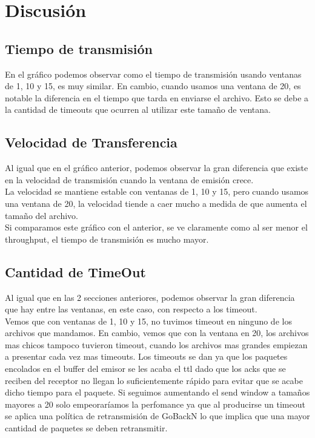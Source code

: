 \newpage
\section{Discusión}
\subsection{Tiempo de transmisión}
\indent En el gráfico podemos observar como el tiempo de transmisión usando
ventanas de 1, 10 y 15, es muy similar. En cambio, cuando usamos una ventana de
20, es notable la diferencia en el tiempo que tarda en enviarse el
archivo. Esto se debe a la cantidad de timeouts que ocurren al utilizar este tamaño de ventana.\\

\subsection{Velocidad de Transferencia}
\indent Al igual que en el gráfico anterior, podemos observar la gran diferencia
que existe en la velocidad de transmisión cuando la ventana de emisión crece.\\
\indent La velocidad se mantiene estable con ventanas de 1,
10 y 15, pero cuando usamos una ventana de 20, la velocidad
tiende a caer mucho a medida de que aumenta el tamaño del archivo.\\
\indent Si comparamos este gráfico con el anterior, se ve claramente como al
ser menor el throughput, el tiempo de transmisión es mucho mayor.\\

\subsection{Cantidad de TimeOut}
\indent Al igual que en las 2 secciones anteriores, podemos observar la gran
diferencia que hay entre las ventanas, en este caso, con respecto a los
timeout.\\
\indent Vemos que con ventanas de 1, 10 y 15, no tuvimos timeout en ninguno de
los archivos que mandamos. En cambio, vemos que con la ventana en 20, los
archivos mas chicos tampoco tuvieron timeout, cuando los archivos mas grandes
empiezan a presentar cada vez mas timeouts. Los timeouts se dan ya que los paquetes encolados en el buffer del emisor se les acaba el ttl dado que los acks que se reciben del receptor no llegan lo suficientemente rápido para evitar que se acabe dicho tiempo para el paquete. Si seguimos aumentando el send window a tamaños mayores a 20 solo empeoraríamos la perfomance ya que al producirse un timeout se aplica una política de retransmisión de GoBackN lo que implica que una mayor cantidad de paquetes se deben retransmitir.